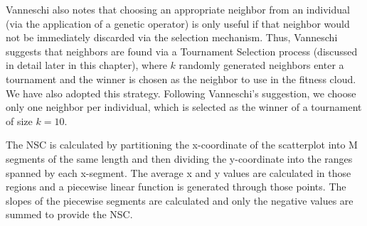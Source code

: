 \documentclass[12pt]{report} 	%
\numberwithin{figure}{chapter}
\numberwithin{table}{chapter}
\numberwithin{equation}{chapter}
\begin{document}
\begin{flushleft}
Vanneschi also notes that choosing an appropriate neighbor from an individual (via the application of a genetic operator) is only useful if that neighbor would not be immediately discarded via the selection mechanism. Thus, Vanneschi suggests that neighbors are found via a Tournament Selection process (discussed in detail later in this chapter), where $k$ randomly generated neighbors enter a tournament and the winner is chosen as the neighbor to use in the fitness cloud. We have also adopted this strategy. Following Vanneschi's suggestion, we choose only one neighbor per individual, which is selected as the winner of a tournament of size $k=10$.

The NSC is calculated by partitioning the x-coordinate of the scatterplot into M segments of the same length and then dividing the y-coordinate into the ranges spanned by each x-segment. The average x and y values are calculated in those regions and a piecewise linear function is generated through those points. The slopes of the piecewise segments are calculated and only the negative values are summed to provide the NSC. 


\end{flushleft}
\end{document}
